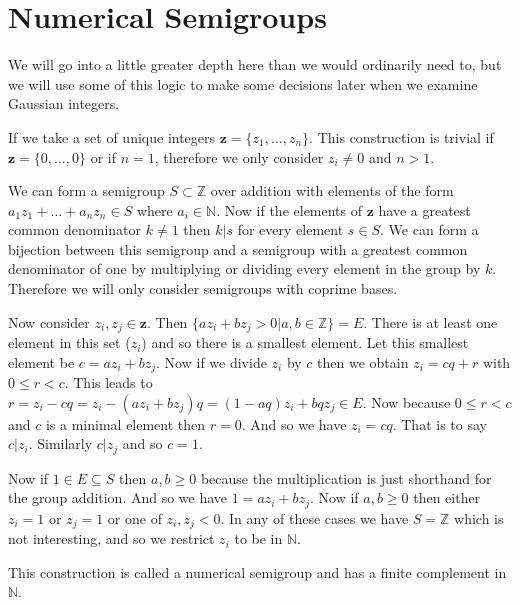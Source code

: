 \documentclass[11pt]{amsart}
\theoremstyle{plain}
\newtheorem{fact}{Fact}
\theoremstyle{definition}
\begin{document}


\section{Numerical Semigroups}
We will go into a little greater depth here than we would ordinarily need to, but we will use some of this logic to make some decisions later when we examine Gaussian integers.

If we take a set of unique integers $\mathbf{z}=\{z_1,\dots,z_n\}$.
This construction is trivial if $\mathbf{z}=\{0,\dots,0\}$ or if $n=1$, therefore we only consider $z_i\ne 0$ and $n>1$.

We can form a semigroup $S\subset \mathbb{Z}$ over addition with elements of the form $a_1z_1+\dots+a_nz_n\in S$ where $a_i\in \mathbb{N}$.
Now if the elements of $\mathbf{z}$ have a greatest common denominator $k\ne 1$ then $k|s$ for every element $s\in S$.
We can form a bijection between this semigroup and a semigroup with a greatest common denominator of one by multiplying or dividing every element in the group by $k$.
Therefore we will only consider semigroups with coprime bases.

Now consider $z_i,z_j\in \mathbf{z}$.
Then $\{az_i+bz_j>0|a,b\in \mathbb{Z}\}=E$.
There is at least one element in this set ($z_i$) and so there is a smallest element. Let this smallest element be $c=az_i+bz_j$.
Now if we divide $z_i$ by $c$ then we obtain $z_i=cq+r$ with $0\le r<c$.
This leads to $r=z_i-cq=z_i-(az_i+bz_j)q=(1-aq)z_i+bqz_j\in E$. Now because $0\le r<c$ and $c$ is a minimal element then $r=0$. And so we have $z_i=cq$.
That is to say $c|z_i$. Similarly $c|z_j$ and so $c=1$.

Now if $1\in E\subseteq S$ then $a,b\ge0$ because the multiplication is just shorthand for the group addition. And so we have $1=az_i+bz_j$.
Now if $a,b\ge 0$ then either $z_i=1$ or $z_j=1$ or one of $z_i,z_j<0$. In any of these cases we have $S=\mathbb{Z}$ which is not interesting, and so we restrict $z_i$ to be in $\mathbb{N}$.

This construction is called a numerical semigroup and has a finite complement in $\mathbb{N}$.\cite{aoki}
\end{document}
